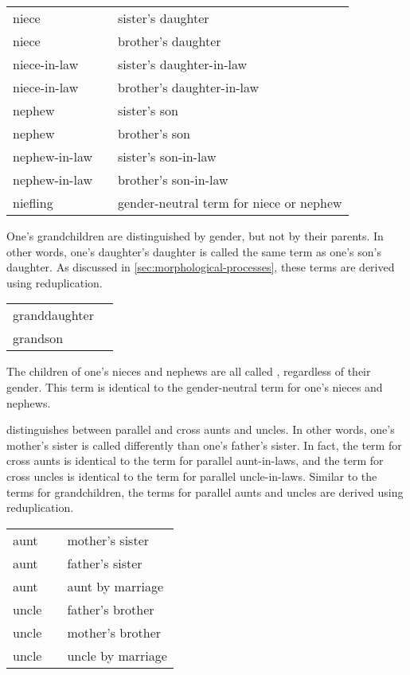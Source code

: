 \exdisplay\noexno
	\begin{tabu} {l l l}
		niece &  & sister's daughter\\
		niece &  & brother's daughter\\
		niece-in-law &  & sister's daughter-in-law\\
		niece-in-law &  & brother's daughter-in-law\\
		nephew &  & sister's son\\
		nephew &  & brother's son\\
		nephew-in-law &  & sister's son-in-law\\
		nephew-in-law &  & brother's son-in-law\\
		niefling &  & gender-neutral term for niece or nephew\\
	\end{tabu}
\xe

One's grandchildren are distinguished by gender, but not by their parents. In other words, one's daughter's daughter is called the same term as one's son's daughter. As discussed in \autoref{sec:morphological-processes}, these terms are derived using reduplication.

\exdisplay\noexno
	\begin{tabu} {l l}
		granddaughter & \\
		grandson & \\
	\end{tabu}
\xe

The children of one's nieces and nephews are all called , regardless of their gender. This term is identical to the gender-neutral term for one's nieces and nephews.

\lang{} distinguishes between parallel and cross aunts and uncles. In other words, one's mother's sister is called differently than one's father's sister. In fact, the term for cross aunts is identical to the term for parallel aunt-in-laws, and the term for cross uncles is identical to the term for parallel uncle-in-laws. Similar to the terms for grandchildren, the terms for parallel aunts and uncles are derived using reduplication.

\exdisplay\noexno
	\begin{tabu} {l l l}
		aunt &  & mother's sister\\
		aunt &  & father's sister\\
		aunt &  & aunt by marriage\\
		uncle &  & father's brother\\
		uncle &  & mother's brother\\
		uncle &  & uncle by marriage\\
	\end{tabu}
\xe

